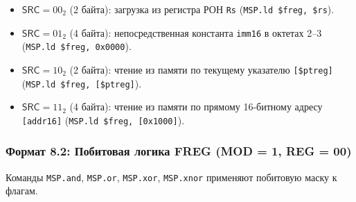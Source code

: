 \documentclass[11pt,a4paper]{article}
\newcommand{\reg}[1]{\texttt{#1}}
\newcommand{\field}[1]{\textsf{#1}}
\begin{document}
\begin{itemize}
  \item $\field{SRC} = 00_2$ (2 байта): загрузка из регистра РОН \reg{Rs} (\texttt{MSP.ld \$freg, \$rs}).
  \item $\field{SRC} = 01_2$ (4 байта): непосредственная константа \texttt{imm16} в октетах 2--3 (\texttt{MSP.ld \$freg, 0x0000}).
  \item $\field{SRC} = 10_2$ (2 байта): чтение из памяти по текущему указателю \texttt{[\$ptreg]} (\texttt{MSP.ld \$freg, [\$ptreg]}).
  \item $\field{SRC} = 11_2$ (4 байта): чтение из памяти по прямому 16-битному адресу \texttt{[addr16]} (\texttt{MSP.ld \$freg, [0x1000]}).
\end{itemize}

\subsubsection{Формат 8.2: Побитовая логика FREG (MOD = 1, REG = 00)}
Команды \texttt{MSP.and}, \texttt{MSP.or}, \texttt{MSP.xor}, \texttt{MSP.xnor} применяют побитовую маску к флагам.
\end{document}
